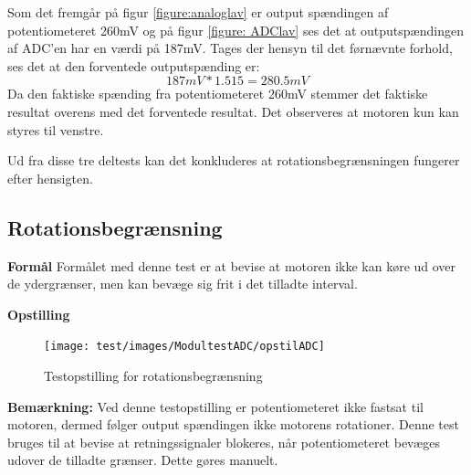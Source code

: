 \noindent Som det fremgår på figur \ref{figure:analoglav} er output spændingen af potentiometeret 260mV og på figur \ref{figure: ADClav} ses det at outputspændingen af ADC’en har en værdi på 187mV. Tages der hensyn til det førnævnte forhold, ses det at den forventede outputspænding er:
\begin{equation}
187mV * 1.515 = 280.5mV
\end{equation}
Da den faktiske spænding fra potentiometeret 260mV stemmer det faktiske resultat overens med det forventede resultat. Det observeres at motoren kun kan styres til venstre.

Ud fra disse tre deltests kan det konkluderes at rotationsbegrænsningen fungerer efter hensigten.

\subsection{Rotationsbegrænsning}
\noindent \textbf{Formål} \newline
\noindent Formålet med denne test er at bevise at motoren ikke kan køre ud over de ydergrænser, men kan bevæge sig frit i det tilladte interval. \newline

\textbf{Opstilling}
\begin{figure}[H]
	\centering
	\texttt{[image: test/images/ModultestADC/opstilADC]}
	\caption{Testopstilling for rotationsbegrænsning}
\end{figure}
\noindent \textbf{Bemærkning: }Ved denne testopstilling er potentiometeret ikke fastsat til motoren, dermed følger output spændingen ikke motorens rotationer. Denne test bruges til at bevise at retningssignaler blokeres, når potentiometeret bevæges udover de tilladte grænser. Dette gøres manuelt. 

